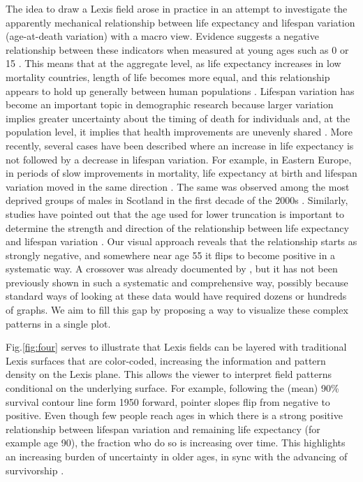 \documentclass[10pt, twoside, parskip=half]{article}
\begin{document}
The idea to draw a Lexis field arose in practice in an attempt to investigate the apparently mechanical relationship between life expectancy and lifespan variation (age-at-death variation) with a macro view. Evidence suggests a negative relationship between these indicators when measured at young ages such as 0 or 15 \citep[\citet{smits2009length},\citet{vaupel2011life},\citet{alvarez2019latin},\citet{colchero2016emergence}]{wilmoth1999rectangularization}. This means that at the aggregate level, as life expectancy increases in low mortality countries, length of life becomes more equal, and this relationship appears to hold up generally between human populations \citep{colchero2016emergence}. Lifespan variation has become an important topic in demographic research because larger variation implies greater uncertainty about the timing of death for individuals and, at the population level, it implies that health improvements are unevenly shared \citep{van2018case}. More recently, several cases have been described where an increase in life expectancy is not followed by a decrease in lifespan variation. For example, in Eastern Europe, in periods of slow improvements in mortality, life expectancy at birth and lifespan variation moved in the same direction \citep{aburto2018lifespan}. The same was observed among the most deprived groups of males in Scotland in the first decade of the 2000s \citep{seaman2019changing}. Similarly, studies have pointed out that the age used for lower truncation is important to determine the strength and direction of the relationship between life expectancy and lifespan variation \citep[\citet{nusselder1996rectangularization}, \citet{robine2001redefining}, \citet{engelman2010implications}, \citet{nemeth2017life}]{myers1984compression}.
Our visual approach reveals that the relationship starts as strongly negative, and somewhere near age 55 it flips to become positive in a systematic way. A crossover was already documented by \citet{myers1984compression}, but it has not been previously shown in such a systematic and comprehensive way, possibly because standard ways of looking at these data would have required dozens or hundreds of graphs. We aim to fill this gap by proposing a way to visualize these complex patterns in a single plot.

Fig.\ref{fig:four} serves to illustrate that Lexis fields can be layered with traditional Lexis surfaces that are color-coded, increasing the information and pattern density on the Lexis plane. This allows the viewer to interpret field patterns conditional on the underlying surface. For example, following the (mean) 90\% survival contour line form 1950 forward, pointer slopes flip from negative to positive. Even though few people reach ages in which there is a strong positive relationship between lifespan variation and remaining life expectancy (for example age 90), the fraction who do so is increasing over time. This highlights an increasing burden of uncertainty in older ages, in sync with the advancing of survivorship \citep{zuo2018advancing}.
\end{document}
